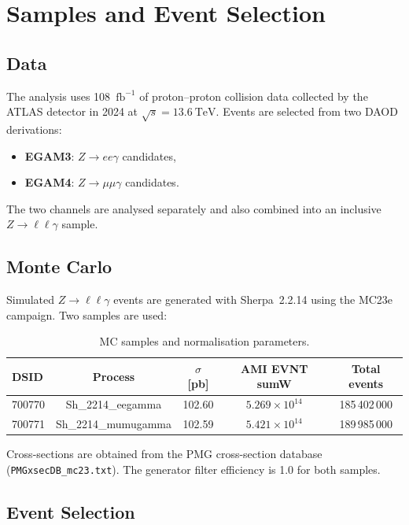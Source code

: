 \documentclass[11pt,a4paper]{article}
\newcommand{\Zllg}{\ensuremath{Z \to \ell\ell\gamma}\xspace}
\newcommand{\Zeeg}{\ensuremath{Z \to ee\gamma}\xspace}
\newcommand{\Zmumug}{\ensuremath{Z \to \mu\mu\gamma}\xspace}
\newcommand{\sqrts}{\ensuremath{\sqrt{s} = 13.6~\text{TeV}}\xspace}
\newcommand{\fbinv}{\ensuremath{\text{fb}^{-1}}\xspace}
\begin{document}
\section{Samples and Event Selection}
\label{sec:samples}

\subsection{Data}

The analysis uses 108~\fbinv of proton--proton collision data collected by the
ATLAS detector in 2024 at $\sqrts$.  Events are selected from two DAOD
derivations:
\begin{itemize}
  \item \textbf{EGAM3}: $\Zeeg$ candidates,
  \item \textbf{EGAM4}: $\Zmumug$ candidates.
\end{itemize}
The two channels are analysed separately and also combined into an inclusive
$\Zllg$ sample.

\subsection{Monte Carlo}

Simulated $\Zllg$ events are generated with Sherpa~2.2.14 using the MC23e
campaign.  Two samples are used:

\begin{table}[H]
\centering
\caption{MC samples and normalisation parameters.}
\label{tab:mc-samples}
\begin{tabular}{lcccc}
\toprule
DSID & Process & $\sigma$ [pb] & AMI EVNT sumW & Total events \\
\midrule
700770 & Sh\_2214\_eegamma   & 102.60 & $5.269 \times 10^{14}$ & 185\,402\,000 \\
700771 & Sh\_2214\_mumugamma & 102.59 & $5.421 \times 10^{14}$ & 189\,985\,000 \\
\bottomrule
\end{tabular}
\end{table}

Cross-sections are obtained from the PMG cross-section database (\texttt{PMGxsecDB\_mc23.txt}).
The generator filter efficiency is 1.0 for both samples.

\subsection{Event Selection}
\end{document}
